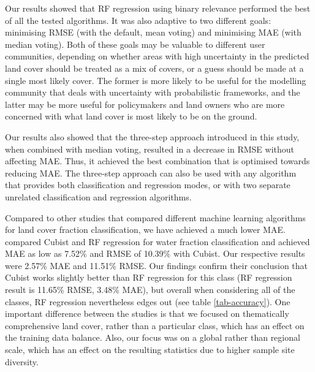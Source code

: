 \documentclass[review,authoryear,3p]{elsarticle}
\begin{document}
Our results showed that \gls{RF} regression using binary relevance performed the best of all the tested algorithms.
It was also adaptive to two different goals: minimising \gls{RMSE} (with the default, mean voting) and minimising \gls{MAE} (with median voting).
Both of these goals may be valuable to different user communities, depending on whether areas with high uncertainty in the predicted land cover should be treated as a mix of covers, or a guess should be made at a single most likely cover.
The former is more likely to be useful for the modelling community that deals with uncertainty with probabilistic frameworks, and the latter may be more useful for policymakers and land owners who are more concerned with what land cover is most likely to be on the ground.

Our results also showed that the three-step approach introduced in this study, when combined with median voting, resulted in a decrease in \gls{RMSE} without affecting \gls{MAE}.
Thus, it achieved the best combination that is optimised towards reducing \gls{MAE}.
The three-step approach can also be used with any algorithm that provides both classification and regression modes, or with two separate unrelated classification and regression algorithms.

Compared to other studies that compared different machine learning algorithms for land cover fraction classification, we have achieved a much lower \gls{MAE}.
\citet{li_monitoring_2018} compared Cubist and \gls{RF} regression for water fraction classification and achieved \gls{MAE} as low as 7.52\% and \gls{RMSE} of 10.39\% with Cubist.
Our respective results were 2.57\% \gls{MAE} and 11.51\% RMSE.
Our findings confirm their conclusion that Cubist works slightly better than \gls{RF} regression for this class (\gls{RF} regression result is 11.65\% \gls{RMSE}, 3.48\% \gls{MAE}), but overall when considering all of the classes, \gls{RF} regression nevertheless edges out (see table \ref{tab-accuracy}).
One important difference between the studies is that we focused on thematically comprehensive land cover, rather than a particular class, which has an effect on the training data balance.
Also, our focus was on a global rather than regional scale, which has an effect on the resulting statistics due to higher sample site diversity.
\end{document}
